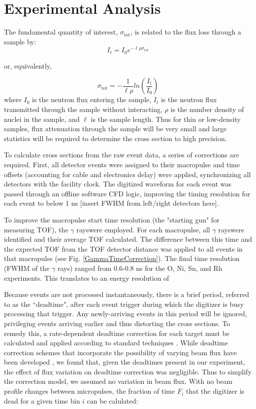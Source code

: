 \documentclass[twocolumn,secnumarabic,amssymb, nobibnotes, aps, prl,
superscriptaddress, nobalancelastpage]{revtex4}
\newcommand{\tot}{\ensuremath{\sigma_{\text{tot}}}}
\newcommand{\gams}{\ensuremath{\gamma} rays}
\begin{document}
\section{Experimental Analysis}

The fundamental quantity of interest, \tot, is related to the flux
loss through a sample by:
$$
I_{t} = I_{0}e^{-{\ell\rho\sigma_{tot}}}
$$

or, equivalently,

$$
\tot = -\frac{1}{\ell\rho}
ln \left(\frac{I_{t}}{I_{0}}\right)
$$
where $I_{0}$ is the neutron flux entering the sample, 
$I_{t}$ is the neutron flux transmitted through the sample without interacting,
$\rho$ is the number density of nuclei in the sample, and
$\ell$ is the sample length. Thus for thin or low-density samples, flux 
attenuation through the sample will be very small and large statistics
will be required to determine the cross section to high precision.

To calculate cross sections from the raw event data, a series of corrections
are required. First, all detector events were assigned to their
macropulse and time offsets (accounting for cable and electronics
delay) were applied, synchronizing all detectors with the facility clock. The 
digitized waveform for each event was passed through an offline software CFD logic, 
improving the timing resolution for each event to below 1 ns [insert FWHM from
left/right detectors here].

To improve the macropulse start time resolution (the "starting gun" for
measuring TOF), the \gams were employed. For each macropulse,
all \gams were identified and their average TOF
calculated. The difference between this time and the expected TOF from the TOF
detector distance was applied to all events in that macropulse (see
Fig. \ref{GammaTimeCorrection}). The final time resolution (FWHM of the \gams)
ranged from 0.6-0.8 ns for the O, Ni, Sn, and Rh experiments. This translates to
an energy resolution of 

Because events are not processed instantaneously, there is a brief period,
referred to as the ``deadtime", after each event trigger during which the digitizer
is busy processing that trigger. Any newly-arriving events in this period will be
ignored, privileging events arriving earlier and thus distorting the cross
sections. To remedy this, a rate-dependent deadtime correction for each target must be 
calculated and applied according to standard techniques \cite{Moore1980}.
While deadtime correction schemes that incorporate the possibility of varying
beam flux have been developed
\cite{Moore1980}, we found that, given the deadtimes present in our
experiment, the effect of flux variation on deadtime correction was negligible.
Thus to simplify the correction model, we assumed no variation in beam flux. 
With no beam profile changes between micropulses, the fraction of time $F_{i}$ that 
the digitizer is dead for a given time bin $i$ can be calulated: 
\end{document}

